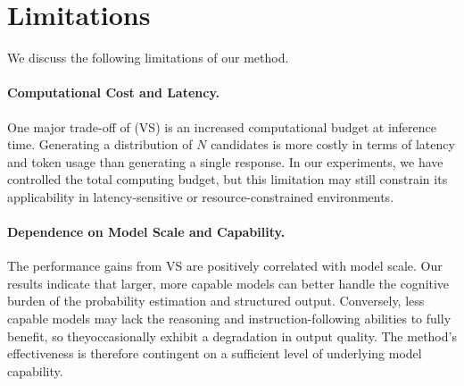 \section{Limitations}\label{sec:limitations}

We discuss the following limitations of our method. %

\paragraph{Computational Cost and Latency.}
One major trade-off of \ours (VS) is an increased computational budget at inference time. Generating a distribution of $N$ candidates is more costly in terms of latency and token usage than generating a single response. In our experiments, we have controlled the total computing budget, but this limitation may still constrain its applicability in latency-sensitive or resource-constrained environments. 

\paragraph{Dependence on Model Scale and Capability.}
The performance gains from VS are positively correlated with model scale. Our results indicate that larger, more capable models can better handle the cognitive burden of the probability estimation and structured output. Conversely, less capable models may lack the reasoning and instruction-following abilities to fully benefit, so theyoccasionally exhibit a degradation in output quality. The method's effectiveness is therefore contingent on a sufficient level of underlying model capability.



